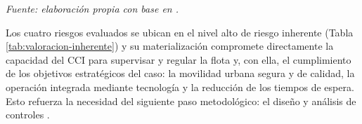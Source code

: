 \begin{flushleft}
    \footnotesize
    \textit{Fuente: elaboración propia con base en \cite{transmilenio2026cci,alcaldia2026cci,transmilenio2020peti,transmilenio2025pesi}.}
\end{flushleft}

Los cuatro riesgos evaluados se ubican en el nivel alto de riesgo inherente (Tabla \ref{tab:valoracion-inherente}) y su materialización compromete directamente la capacidad del CCI para supervisar y regular la flota y, con ella, el cumplimiento de los objetivos estratégicos del caso: la movilidad urbana segura y de calidad, la operación integrada mediante tecnología y la reducción de los tiempos de espera. Esto refuerza la necesidad del siguiente paso metodológico: el diseño y análisis de controles \parencite{funcionpublica2025}.

